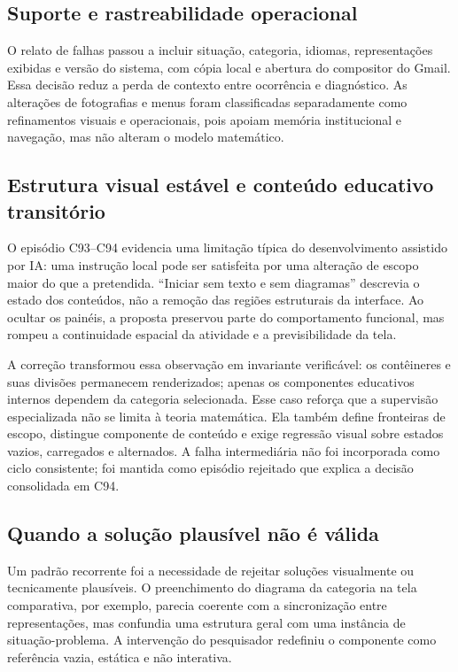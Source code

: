 \documentclass[preprint,12pt,authoryear]{elsarticle}
\begin{document}
\subsection{Suporte e rastreabilidade operacional}
O relato de falhas passou a incluir situação, categoria, idiomas, representações exibidas e versão do sistema, com cópia local e abertura do compositor do Gmail. Essa decisão reduz a perda de contexto entre ocorrência e diagnóstico. As alterações de fotografias e menus foram classificadas separadamente como refinamentos visuais e operacionais, pois apoiam memória institucional e navegação, mas não alteram o modelo matemático.

\subsection{Estrutura visual estável e conteúdo educativo transitório}
O episódio C93--C94 evidencia uma limitação típica do desenvolvimento assistido por IA: uma instrução local pode ser satisfeita por uma alteração de escopo maior do que a pretendida. ``Iniciar sem texto e sem diagramas'' descrevia o estado dos conteúdos, não a remoção das regiões estruturais da interface. Ao ocultar os painéis, a proposta preservou parte do comportamento funcional, mas rompeu a continuidade espacial da atividade e a previsibilidade da tela.

A correção transformou essa observação em invariante verificável: os contêineres e suas divisões permanecem renderizados; apenas os componentes educativos internos dependem da categoria selecionada. Esse caso reforça que a supervisão especializada não se limita à teoria matemática. Ela também define fronteiras de escopo, distingue componente de conteúdo e exige regressão visual sobre estados vazios, carregados e alternados. A falha intermediária não foi incorporada como ciclo consistente; foi mantida como episódio rejeitado que explica a decisão consolidada em C94.

\subsection{Quando a solução plausível não é válida}
Um padrão recorrente foi a necessidade de rejeitar soluções visualmente ou tecnicamente plausíveis. O preenchimento do diagrama da categoria na tela comparativa, por exemplo, parecia coerente com a sincronização entre representações, mas confundia uma estrutura geral com uma instância de situação-problema. A intervenção do pesquisador redefiniu o componente como referência vazia, estática e não interativa.
\end{document}
